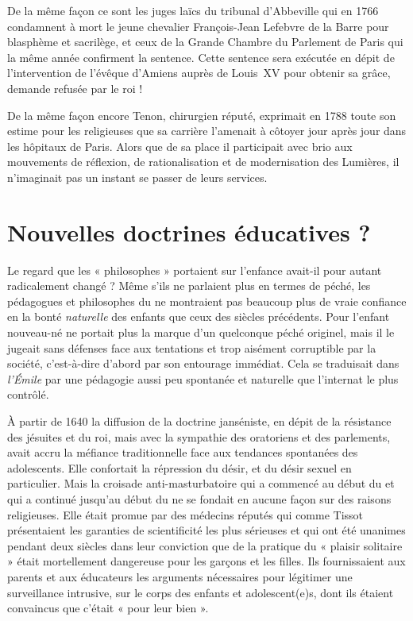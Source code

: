 De la même façon ce sont les juges laïcs du tribunal d'Abbeville qui en 1766 condamnent à mort le jeune chevalier François-Jean Lefebvre de la Barre pour blasphème et sacrilège, et ceux de la Grande Chambre du Parlement de Paris qui la même année confirment la sentence. Cette sentence sera exécutée en dépit de l'intervention de l'évêque d'Amiens auprès de Louis~XV pour obtenir sa grâce, demande refusée par le roi !
 
 De la même façon encore Tenon, chirurgien réputé, exprimait en 1788 toute son estime pour les religieuses que sa carrière l'amenait à côtoyer jour après jour dans les hôpitaux de Paris. Alors que de sa place il participait avec brio aux mouvements de réflexion, de rationalisation et de modernisation des Lumières, il n'imaginait pas un instant se passer de leurs services. 




\section{Nouvelles doctrines éducatives ?}

 
Le regard que les « {philosophes} » portaient sur l'enfance avait-il pour autant radicalement changé ? Même s'ils ne parlaient plus en termes de péché, les pédagogues et philosophes du  ne montraient pas beaucoup plus de vraie confiance en la bonté \emph{naturelle} des enfants que ceux des siècles précédents. Pour  l'enfant nouveau-né ne portait plus la marque d'un quelconque péché originel, mais il le jugeait sans défenses face aux tentations et trop aisément corruptible par la société, c'est-à-dire d'abord par son entourage immédiat. Cela se traduisait dans \emph{l'Émile} par une pédagogie aussi peu spontanée et naturelle que l'internat le plus contrôlé. 
 
  À partir de 1640 la diffusion de la doctrine janséniste, en dépit de la résistance des jésuites et du roi, mais avec la sympathie des oratoriens et des parlements, avait accru la méfiance traditionnelle face aux tendances spontanées des adolescents. Elle confortait la répression du désir, et du désir sexuel en particulier. Mais la croisade anti-masturbatoire qui a commencé au début du  et qui a continué jusqu'au début du  ne se fondait en aucune façon sur des raisons religieuses. Elle était promue par des médecins réputés qui comme Tissot présentaient les garanties de scientificité les plus sérieuses et qui ont été unanimes pendant deux siècles dans leur conviction que de la pratique du « plaisir solitaire » était mortellement dangereuse pour les garçons et les filles. Ils fournissaient aux parents et aux éducateurs les arguments nécessaires pour légitimer une surveillance intrusive, sur le corps des enfants et adolescent(e)s, dont ils étaient convaincus que c'était « pour leur bien ».
  
